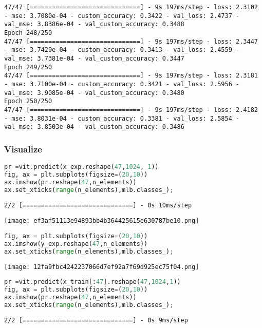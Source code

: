\begin{lstlisting}
47/47 [==============================] - 9s 197ms/step - loss: 2.3102 - mse: 3.7080e-04 - custom_accuracy: 0.3422 - val_loss: 2.4737 - val_mse: 3.8386e-04 - val_custom_accuracy: 0.3488
Epoch 248/250
47/47 [==============================] - 9s 197ms/step - loss: 2.3447 - mse: 3.7429e-04 - custom_accuracy: 0.3413 - val_loss: 2.4559 - val_mse: 3.7381e-04 - val_custom_accuracy: 0.3447
Epoch 249/250
47/47 [==============================] - 9s 197ms/step - loss: 2.3181 - mse: 3.7100e-04 - custom_accuracy: 0.3421 - val_loss: 2.5956 - val_mse: 3.9085e-04 - val_custom_accuracy: 0.3480
Epoch 250/250
47/47 [==============================] - 9s 197ms/step - loss: 2.4182 - mse: 3.8031e-04 - custom_accuracy: 0.3381 - val_loss: 2.5854 - val_mse: 3.8503e-04 - val_custom_accuracy: 0.3486
\end{lstlisting}

\hypertarget{visualize}{%
\subsubsection{Visualize}\label{visualize}}

\begin{lstlisting}[language=Python]
pr =vit.predict(x_exp.reshape(47,1024, 1))
fig, ax = plt.subplots(figsize=(20,10))
ax.imshow(pr.reshape(47,n_elements))
ax.set_xticks(range(n_elements),mlb.classes_);
\end{lstlisting}

\begin{lstlisting}
2/2 [==============================] - 0s 10ms/step
\end{lstlisting}

\texttt{[image: ef3af51113e94893bb4b364425615e630787be10.png]}

\begin{lstlisting}[language=Python]
fig, ax = plt.subplots(figsize=(20,10))
ax.imshow(y_exp.reshape(47,n_elements))
ax.set_xticks(range(n_elements),mlb.classes_);
\end{lstlisting}

\texttt{[image: 12fa9fbc4242237066d7ef92a7f69d925ec75f04.png]}

\begin{lstlisting}[language=Python]
pr =vit.predict(x_train[:47].reshape(47,1024,1))
fig, ax = plt.subplots(figsize=(20,10))
ax.imshow(pr.reshape(47,n_elements))
ax.set_xticks(range(n_elements),mlb.classes_);
\end{lstlisting}

\begin{lstlisting}
2/2 [==============================] - 0s 9ms/step
\end{lstlisting}

